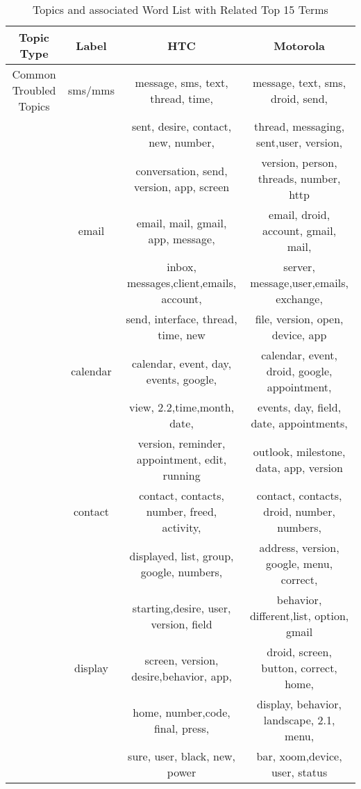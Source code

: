 \documentclass[10pt, conference, compsocconf]{IEEEtran}
\begin{document}
\begin{table*}[!htb]
\renewcommand{\arraystretch}{1.3}
\caption{Topics and associated Word List with Related Top 15 Terms}
\label{topicslist}
\centering
\begin{tabular}{|c||c||c||c|}
\hline
Topic Type & Label & HTC & Motorola\\ 
\hline
Common Troubled Topics & sms\//mms &message,	sms,	text, thread, time,  & message, text, sms, droid, send,	\\
&& sent, desire, contact, new, number, &	thread, messaging, sent,user, version,\\ 
&&conversation, send, version, app, screen &version, person, threads, number, http\\ \cline{2-4}

  & email & email, mail, gmail, app, message,   &email, droid, account,	gmail, mail, \\
&&inbox, messages,client,emails, account,  &server, message,user,emails, exchange, \\ 
&&send, interface, thread, time, new & file, version, open, device, app\\ \cline{2-4}
            
& calendar&calendar, event, day, events, google,  &calendar,	event, droid, google, appointment, \\
&&view, 2.2,time,month, date, &events, day, field, date, appointments, \\ 
&&version, reminder, appointment,  edit, running &outlook, milestone, data, app, version\\ \cline{2-4}
            
& contact & contact, contacts, number, freed, activity,  &contact, contacts, droid, number, numbers, \\
&&displayed, list, group, google, numbers,   &address, version, google, menu, correct, \\
&&starting,desire, user, version, field & behavior, different,list, option, gmail\\ \cline{2-4}
            
  & display&screen, version, desire,behavior, app, &droid, screen, button, correct, home, \\
&& home, number,code, final, press,  &display, behavior,  landscape, 2.1,  menu, \\
&&sure, user, black, new, power  &bar, xoom,device, user, status\\ \cline{2-4}
   

\end{tabular}
\end{table*}
\end{document}
